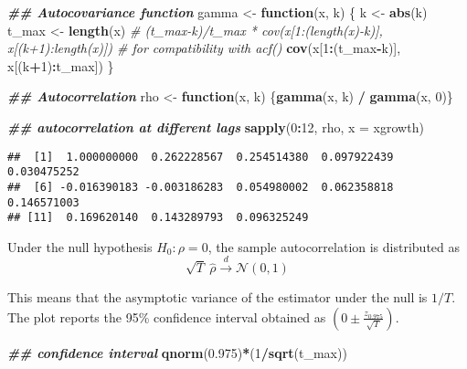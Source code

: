 \documentclass[
]{book}
\newenvironment{Shaded}{\begin{snugshade}}{\end{snugshade}}
\newcommand{\AttributeTok}[1]{\textcolor[rgb]{0.13,0.29,0.53}{#1}}
\newcommand{\CommentTok}[1]{\textcolor[rgb]{0.56,0.35,0.01}{\textit{#1}}}
\newcommand{\ControlFlowTok}[1]{\textcolor[rgb]{0.13,0.29,0.53}{\textbf{#1}}}
\newcommand{\DecValTok}[1]{\textcolor[rgb]{0.00,0.00,0.81}{#1}}
\newcommand{\DocumentationTok}[1]{\textcolor[rgb]{0.56,0.35,0.01}{\textbf{\textit{#1}}}}
\newcommand{\FloatTok}[1]{\textcolor[rgb]{0.00,0.00,0.81}{#1}}
\newcommand{\FunctionTok}[1]{\textcolor[rgb]{0.13,0.29,0.53}{\textbf{#1}}}
\newcommand{\NormalTok}[1]{#1}
\newcommand{\OtherTok}[1]{\textcolor[rgb]{0.56,0.35,0.01}{#1}}
\newcommand{\SpecialCharTok}[1]{\textcolor[rgb]{0.81,0.36,0.00}{\textbf{#1}}}
\begin{document}
\begin{Shaded}
\begin{Highlighting}[]
\DocumentationTok{\#\# Autocovariance function}
\NormalTok{gamma }\OtherTok{\textless{}{-}} \ControlFlowTok{function}\NormalTok{(x, k) \{}
\NormalTok{  k }\OtherTok{\textless{}{-}} \FunctionTok{abs}\NormalTok{(k)}
\NormalTok{  t\_max }\OtherTok{\textless{}{-}} \FunctionTok{length}\NormalTok{(x)}
  \CommentTok{\# (t\_max{-}k)/t\_max * cov(x[1:(length(x){-}k)], x[(k+1):length(x)]) \# for compatibility with acf()}
  \FunctionTok{cov}\NormalTok{(x[}\DecValTok{1}\SpecialCharTok{:}\NormalTok{(t\_max}\SpecialCharTok{{-}}\NormalTok{k)], x[(k}\SpecialCharTok{+}\DecValTok{1}\NormalTok{)}\SpecialCharTok{:}\NormalTok{t\_max])}
\NormalTok{\}}

\DocumentationTok{\#\# Autocorrelation}
\NormalTok{rho }\OtherTok{\textless{}{-}} \ControlFlowTok{function}\NormalTok{(x, k) \{}\FunctionTok{gamma}\NormalTok{(x, k) }\SpecialCharTok{/} \FunctionTok{gamma}\NormalTok{(x, }\DecValTok{0}\NormalTok{)\}}

\DocumentationTok{\#\# autocorrelation at different lags}
\FunctionTok{sapply}\NormalTok{(}\DecValTok{0}\SpecialCharTok{:}\DecValTok{12}\NormalTok{, rho, }\AttributeTok{x =}\NormalTok{ xgrowth)}
\end{Highlighting}
\end{Shaded}

\begin{verbatim}
##  [1]  1.000000000  0.262228567  0.254514380  0.097922439  0.030475252
##  [6] -0.016390183 -0.003186283  0.054980002  0.062358818  0.146571003
## [11]  0.169620140  0.143289793  0.096325249
\end{verbatim}

Under the null hypothesis \(H_0: \rho = 0\), the sample autocorrelation is distributed as
\[
\sqrt{T} \ \hat{\rho} \xrightarrow{d} \mathcal{N}(0, 1)
\]

This means that the asymptotic variance of the estimator under the null is \(1/T\). The plot reports the 95\% confidence interval obtained as \(\left(0 \pm \frac{z_{0.975}}{\sqrt{T}}\right)\).

\begin{Shaded}
\begin{Highlighting}[]
\DocumentationTok{\#\# confidence interval}
\FunctionTok{qnorm}\NormalTok{(}\FloatTok{0.975}\NormalTok{)}\SpecialCharTok{*}\NormalTok{(}\DecValTok{1}\SpecialCharTok{/}\FunctionTok{sqrt}\NormalTok{(t\_max))}
\end{Highlighting}
\end{Shaded}
\end{document}
